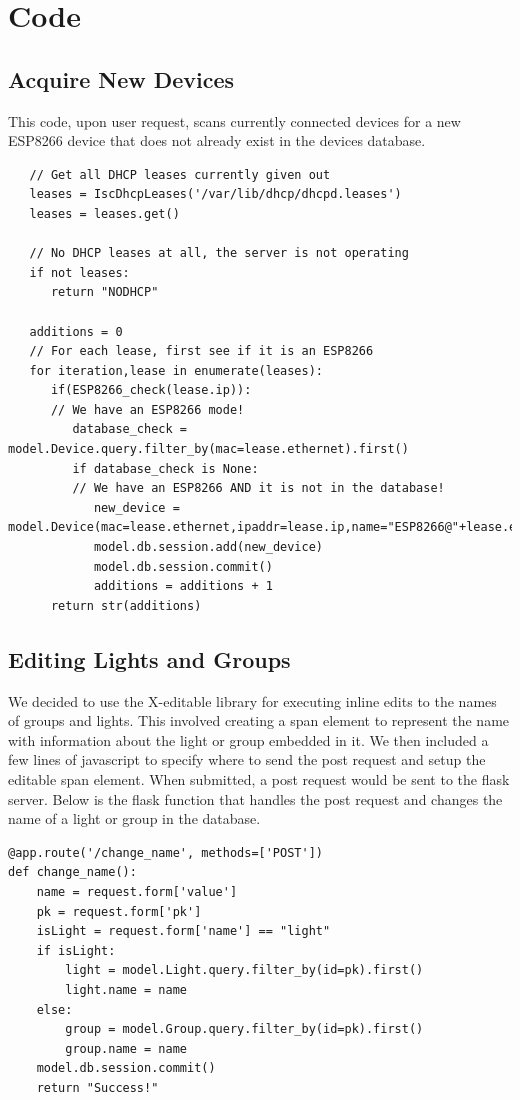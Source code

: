 \documentclass[oneside,openright]{book}
\begin{document}
\section{Code}

\subsection{Acquire New Devices}

This code, upon user request, scans currently connected devices for a new
ESP8266 device that does not already exist in the devices database.

\begin{lstlisting}
   // Get all DHCP leases currently given out
   leases = IscDhcpLeases('/var/lib/dhcp/dhcpd.leases')
   leases = leases.get()

   // No DHCP leases at all, the server is not operating
   if not leases:
      return "NODHCP"

   additions = 0
   // For each lease, first see if it is an ESP8266
   for iteration,lease in enumerate(leases):
      if(ESP8266_check(lease.ip)):
      // We have an ESP8266 mode!
         database_check = model.Device.query.filter_by(mac=lease.ethernet).first()
         if database_check is None:
         // We have an ESP8266 AND it is not in the database!
            new_device = model.Device(mac=lease.ethernet,ipaddr=lease.ip,name="ESP8266@"+lease.ethernet)
            model.db.session.add(new_device)
            model.db.session.commit()
            additions = additions + 1
      return str(additions)
   \end{lstlisting}

\subsection{Editing Lights and Groups}

We decided to use the X-editable library for executing inline edits to the
names of groups and lights. This involved creating a span element to represent
the name with information about the light or group embedded in it. We then
included a few lines of javascript to specify where to send the post request
and setup the editable span element. When submitted, a post request would be
sent to the flask server. Below is the flask function that handles the post
request and changes the name of a light or group in the database.

\begin{lstlisting}
@app.route('/change_name', methods=['POST'])
def change_name():
    name = request.form['value']
    pk = request.form['pk']
    isLight = request.form['name'] == "light"
    if isLight:
        light = model.Light.query.filter_by(id=pk).first()
        light.name = name
    else:
        group = model.Group.query.filter_by(id=pk).first()
        group.name = name
    model.db.session.commit()
    return "Success!"
\end{lstlisting}
\end{document}
